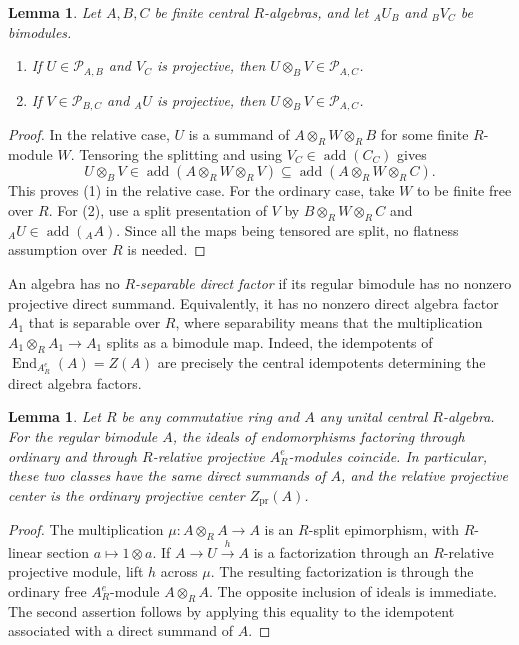 \documentclass[12pt,a4paper,english,reqno]{amsart}
\numberwithin{equation}{section}
\theoremstyle{plain}
\newtheorem{lemma}[theorem]{Lemma}
\theoremstyle{definition}
\begin{document}
\begin{lemma}
\label{lem:projective-cross-tensors}
Let $A,B,C$ be finite central $R$-algebras, and let ${}_AU_B$ and
${}_BV_C$ be bimodules.
\begin{enumerate}
\item If $U\in\mathcal P_{A,B}$ and $V_C$ is projective,
then $U\otimes_BV\in\mathcal P_{A,C}$.
\item If $V\in\mathcal P_{B,C}$ and ${}_AU$ is projective,
then $U\otimes_BV\in\mathcal P_{A,C}$.
\end{enumerate}
\end{lemma}

\begin{proof}
In the relative case, $U$ is a summand of
$A\otimes_RW\otimes_RB$ for some finite $R$-module $W$.
Tensoring the splitting and using $V_C\in\operatorname{add}(C_C)$
gives
\[
 U\otimes_BV\in\operatorname{add}(A\otimes_RW\otimes_RV)
 \subseteq\operatorname{add}(A\otimes_RW\otimes_RC).
\]
This proves (1) in the relative case.  For the ordinary case, take $W$
to be finite free over $R$.  For (2), use a split presentation of $V$ by
$B\otimes_RW\otimes_RC$ and
${}_AU\in\operatorname{add}({}_AA)$.  Since all the maps being tensored
are split, no flatness assumption over $R$ is needed.
\end{proof}

An algebra has no \emph{$R$-separable direct factor} if
its regular bimodule has no nonzero projective direct summand.
Equivalently, it has no nonzero direct algebra factor $A_1$ that is
separable over $R$, where separability means that the multiplication
$A_1\otimes_RA_1\to A_1$ splits as a bimodule map.  Indeed, the
idempotents of $\operatorname{End}_{A^e_R}(A)=Z(A)$ are precisely
the central idempotents determining the direct algebra factors.

\begin{lemma}
\label{lem:unit-relative-projective-center}
Let $R$ be any commutative ring and $A$ any unital central
$R$-algebra.  For the regular bimodule $A$, the ideals of endomorphisms factoring
through ordinary and through $R$-relative projective $A^e_R$-modules
coincide.  In particular, these two classes have the same direct
summands of $A$, and the relative projective center is the ordinary
projective center $Z_{\mathrm{pr}}(A)$.
\end{lemma}

\begin{proof}
The multiplication $\mu:A\otimes_RA\to A$ is an $R$-split
epimorphism, with $R$-linear section $a\mapsto1\otimes a$.
If $A\to U\xrightarrow{h}A$ is a factorization through an
$R$-relative projective module, lift $h$ across $\mu$.
The resulting factorization is through the ordinary free
$A^e_R$-module $A\otimes_RA$.  The opposite inclusion of ideals
is immediate.  The second assertion follows by applying this equality
to the idempotent associated with a direct summand of $A$.
\end{proof}
\end{document}
